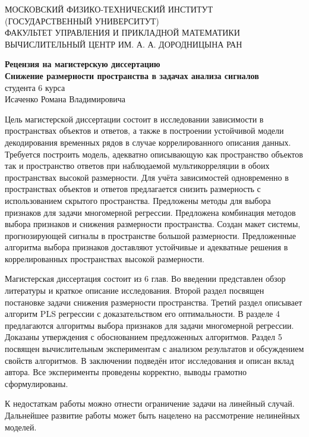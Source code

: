 \documentclass[12pt,oneside]{article}
\theoremstyle{definition}
\begin{document}
	\thispagestyle{empty}
	\begin{center}
		\sc
		МОСКОВСКИЙ ФИЗИКО-ТЕХНИЧЕСКИЙ ИНСТИТУТ \\
		(ГОСУДАРСТВЕННЫЙ УНИВЕРСИТУТ) \\
		ФАКУЛЬТЕТ УПРАВЛЕНИЯ И ПРИКЛАДНОЙ МАТЕМАТИКИ \\
		ВЫЧИСЛИТЕЛЬНЫЙ ЦЕНТР ИМ. А. А. ДОРОДНИЦЫНА РАН\\[1cm]
	\end{center}
\begin{center}
	{\bf
	Рецензия на магистерскую диссертацию \\[2mm]
	Снижение размерности пространства в задачах анализа сигналов} \\ [2mm]
	студента 6 курса \\
	Исаченко Романа Владимировича
\end{center}

Цель магистерской диссертации состоит в исследовании зависимости в пространствах объектов и ответов, а также в построении устойчивой модели декодирования временных рядов в случае коррелированного описания данных.
Требуется построить модель, адекватно описывающую как пространство объектов так и пространство ответов при наблюдаемой мультикорреляции в обоих пространствах высокой размерности.
Для учёта зависимостей одновременно в пространствах объектов и ответов предлагается снизить размерность с использованием скрытого пространства.
Предложены методы для выбора признаков для задачи многомерной регрессии.
Предложена комбинация методов выбора признаков и снижения размерности пространства.
Создан макет системы, прогнозирующей сигналы в пространстве большой размерности.
Предложенные алгоритма выбора признаков доставляют устойчивые и адекватные решения в коррелированных пространствах высокой размерности.

Магистерская диссертация состоит из 6 глав.
Во введении представлен обзор литературы и краткое описание исследования.
Второй раздел посвящен постановке задачи снижения размерности пространства.
Третий раздел описывает алгоритм PLS регрессии с доказательством его оптимальности.
В разделе 4 предлагаются алгоритмы выбора признаков для задачи многомерной регрессии. 
Доказаны утверждения с обоснованием предложенных алгоритмов.
Раздел 5 посвящен вычислительным экспериментам с анализом результатов и обсуждением свойств алгоритмов.
В заключении подведён итог исследования и описан вклад автора.
Все эксперименты проведены корректно, выводы грамотно сформулированы.

К недостаткам работы можно отнести ограничение задачи на линейный случай. Дальнейшее развитие работы может быть нацелено на рассмотрение нелинейных моделей.
\end{document}

